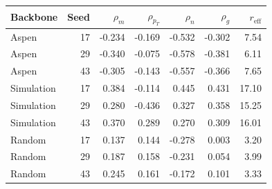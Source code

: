 \begin{tabular}{lrrrrrr}
\toprule
Backbone & Seed & $\rho_m$ & $\rho_{p_T}$ & $\rho_n$ & $\rho_g$ & $r_{\mathrm{eff}}$ \\
\midrule
Aspen & 17 & -0.234 & -0.169 & -0.532 & -0.302 & 7.54 \\
Aspen & 29 & -0.340 & -0.075 & -0.578 & -0.381 & 6.11 \\
Aspen & 43 & -0.305 & -0.143 & -0.557 & -0.366 & 7.65 \\
Simulation & 17 & 0.384 & -0.114 & 0.445 & 0.431 & 17.10 \\
Simulation & 29 & 0.280 & -0.436 & 0.327 & 0.358 & 15.25 \\
Simulation & 43 & 0.370 & 0.289 & 0.270 & 0.309 & 16.01 \\
Random & 17 & 0.137 & 0.144 & -0.278 & 0.003 & 3.20 \\
Random & 29 & 0.187 & 0.158 & -0.231 & 0.054 & 3.99 \\
Random & 43 & 0.245 & 0.161 & -0.172 & 0.101 & 3.33 \\
\bottomrule
\end{tabular}
